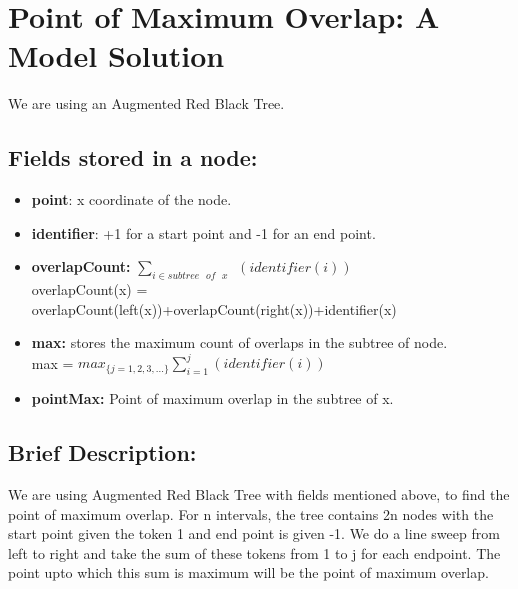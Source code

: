 \documentclass[pdftex,a4paper,12pt]{report}
\begin{document}
\newpage

\section{Point of Maximum Overlap: A Model Solution}
We are using an Augmented Red Black Tree.
\subsection{Fields stored in a node:}
  \begin{itemize}
    \item \textbf{point}: x coordinate of the node.
    \item \textbf{identifier}: +1 for a start point and -1 for an end point.
    \item \textbf{overlapCount:} $\sum_{i\in{subtree\texttt{ } of\texttt{ } x\texttt{ }}}^{}(identifier(i))$ \\
overlapCount(x) = overlapCount(left(x))+overlapCount(right(x))+identifier(x)
    \item \textbf{max:} stores the maximum count of overlaps in the subtree of node.\\
    max = $max_{\{j=1,2,3,...\}}\sum_{i=1}^{j}(identifier(i))$
    \item \textbf{pointMax:} Point of maximum overlap in the subtree of x.  
  \end{itemize}
\subsection{Brief Description:}
We are using Augmented Red Black Tree with fields mentioned above, to find the point of maximum overlap.
For n intervals, the tree contains 2n nodes with the start point given the token 1 and end point is given -1.
We do a line sweep from left to right and take the sum of these tokens from 1 to j for each endpoint.
The point upto which this sum is maximum will be the point of maximum overlap. 
\end{document}
